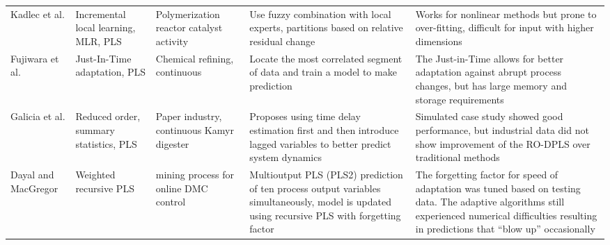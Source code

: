 \begin{table}[htbp]
{\begin{tabular}{p{1.5cm} p{2cm} p{2cm} p{4cm} p{4cm}}
    Kadlec et al. \cite{Kadlec2011a} & Incremental local learning, MLR, PLS & Polymerization reactor catalyst activity& Use fuzzy combination with local experts, partitions based on relative residual change & Works for nonlinear methods but prone to over-fitting, difficult for input with higher dimensions \\
    Fujiwara et al. \cite{Fujiwara2009}& Just-In-Time adaptation, PLS  & Chemical refining, continuous & Locate the most correlated segment of data and train a model to make prediction & The Just-in-Time allows for better adaptation against abrupt process changes, but has large memory and storage requirements \\
    Galicia et al. \cite{Galicia2011} & Reduced order, summary statistics, PLS & Paper industry, continuous Kamyr digester & Proposes using time delay estimation first and then introduce lagged variables to better predict system dynamics & Simulated case study showed good performance, but industrial data did not show improvement of the RO-DPLS over traditional methods \\
    Dayal and MacGregor \cite{Dayal1997} & Weighted recursive PLS & mining process for online DMC control & Multioutput PLS (PLS2) prediction of ten process output variables simultaneously, model is updated using recursive PLS with forgetting factor & The forgetting factor for speed of adaptation was tuned based on testing data. The adaptive algorithms still experienced numerical difficulties resulting in predictions that ``blow up'' occasionally\\
    \bottomrule
    \end{tabular}}
  \label{tab:lit_review}%

\end{table}%
